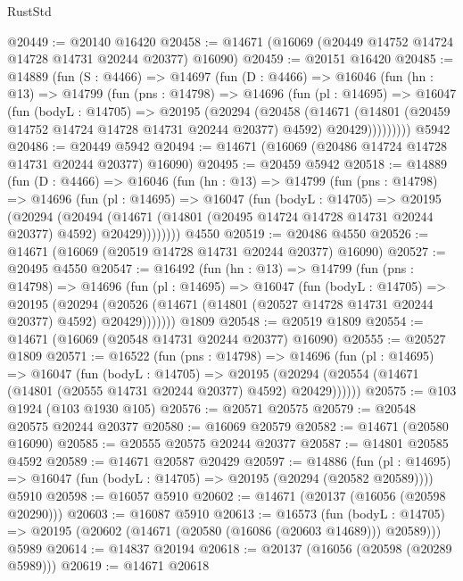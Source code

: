\begin{lexlean}{RustStd}
\begin{coremodule}
@20449 := @20140 @16420
@20458 := @14671 (@16069 (@20449 @14752 @14724 @14728 @14731 @20244 @20377) @16090)
@20459 := @20151 @16420
@20485 := @14889
    (fun (S : @4466) =>
    @14697
      (fun (D : @4466) =>
      @16046
        (fun (hn : @13) =>
        @14799
          (fun (pns : @14798) =>
          @14696
            (fun (pl : @14695) =>
            @16047
              (fun (bodyL : @14705) =>
              @20195
                (@20294
                  (@20458
                    (@14671
                      (@14801 (@20459 @14752 @14724 @14728 @14731 @20244 @20377) @4592)
                      @20429)))))))))
    @5942
@20486 := @20449 @5942
@20494 := @14671 (@16069 (@20486 @14724 @14728 @14731 @20244 @20377) @16090)
@20495 := @20459 @5942
@20518 := @14889
    (fun (D : @4466) =>
    @16046
      (fun (hn : @13) =>
      @14799
        (fun (pns : @14798) =>
        @14696
          (fun (pl : @14695) =>
          @16047
            (fun (bodyL : @14705) =>
            @20195
              (@20294
                (@20494
                  (@14671 (@14801 (@20495 @14724 @14728 @14731 @20244 @20377) @4592) @20429))))))))
    @4550
@20519 := @20486 @4550
@20526 := @14671 (@16069 (@20519 @14728 @14731 @20244 @20377) @16090)
@20527 := @20495 @4550
@20547 := @16492
    (fun (hn : @13) =>
    @14799
      (fun (pns : @14798) =>
      @14696
        (fun (pl : @14695) =>
        @16047
          (fun (bodyL : @14705) =>
          @20195
            (@20294
              (@20526 (@14671 (@14801 (@20527 @14728 @14731 @20244 @20377) @4592) @20429)))))))
    @1809
@20548 := @20519 @1809
@20554 := @14671 (@16069 (@20548 @14731 @20244 @20377) @16090)
@20555 := @20527 @1809
@20571 := @16522
    (fun (pns : @14798) =>
    @14696
      (fun (pl : @14695) =>
      @16047
        (fun (bodyL : @14705) =>
        @20195 (@20294 (@20554 (@14671 (@14801 (@20555 @14731 @20244 @20377) @4592) @20429))))))
@20575 := @103 @1924 (@103 @1930 @105)
@20576 := @20571 @20575
@20579 := @20548 @20575 @20244 @20377
@20580 := @16069 @20579
@20582 := @14671 (@20580 @16090)
@20585 := @20555 @20575 @20244 @20377
@20587 := @14801 @20585 @4592
@20589 := @14671 @20587 @20429
@20597 := @14886
    (fun (pl : @14695) => @16047 (fun (bodyL : @14705) => @20195 (@20294 (@20582 @20589))))
    @5910
@20598 := @16057 @5910
@20602 := @14671 (@20137 (@16056 (@20598 @20290)))
@20603 := @16087 @5910
@20613 := @16573
    (fun (bodyL : @14705) => @20195 (@20602 (@14671 (@20580 (@16086 (@20603 @14689))) @20589)))
    @5989
@20614 := @14837 @20194
@20618 := @20137 (@16056 (@20598 (@20289 @5989)))
@20619 := @14671 @20618

\end{coremodule}
\end{lexlean}

